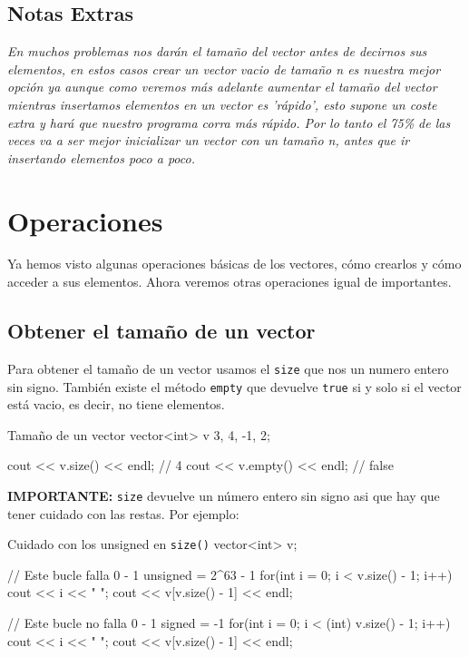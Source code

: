 \documentclass{article}
\begin{document}
    \subsection{Notas Extras}

    \textit{En muchos problemas nos darán el tamaño del vector antes de decirnos sus elementos, en estos casos crear un 
    vector vacio de tamaño n es nuestra mejor opción ya aunque como veremos más adelante aumentar el tamaño del vector mientras
    insertamos elementos en un vector es 'rápido', esto supone un coste extra y hará que nuestro programa corra más rápido. 
    Por lo tanto el 75\% de las veces  va a ser mejor inicializar un vector con un tamaño n, antes que ir insertando elementos poco a poco. }
    \pagebreak
    \section{Operaciones}

    Ya hemos visto algunas operaciones básicas de los vectores, cómo crearlos y cómo acceder a sus elementos. Ahora veremos
    otras operaciones igual de importantes.

    \subsection{Obtener el tamaño de un vector}

    Para obtener el tamaño de un vector usamos el \texttt{size} que nos un numero entero sin signo. 
    También existe el método \texttt{empty} que devuelve \texttt{true} si y solo si el vector está 
    vacio, es decir, no tiene elementos.

    \begin{codelisting}{Tamaño de un vector}
    vector<int> v {3, 4, -1, 2};

    cout << v.size() << endl; // 4
    cout << v.empty() << endl; // false

    \end{codelisting}


    \textbf{IMPORTANTE:} \texttt{size} devuelve un número entero sin signo asi que hay que tener cuidado con las
    restas. Por ejemplo:

    \begin{codelisting}{Cuidado con los unsigned en \texttt{size()}}
vector<int> v;

// Este bucle falla 0 - 1 unsigned = 2^63 - 1
for(int i = 0; i < v.size() - 1; i++) {
    cout << i << " ";
}
cout << v[v.size() - 1] << endl;

// Este bucle no falla 0 - 1 signed = -1
for(int i = 0; i < (int) v.size() - 1; i++) {
    cout << i << " ";
}
cout << v[v.size() - 1] << endl;

\end{codelisting}
\end{document}
